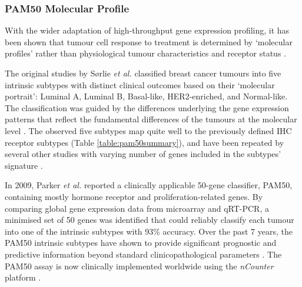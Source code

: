     
    
    
    
    
    
    
            
 
            
    \subsubsection{PAM50 Molecular Profile} \label{section:pam50}
    

With the wider adaptation of high-throughput gene expression profiling, it has been shown that tumour cell response to treatment is determined by ‘molecular profiles’ rather than physiological tumour characteristics and receptor status \cite{Weigelt2010}. 

The original studies by Sørlie \textit{et al.} \cite{Srlie2001GeneImplications} classified breast cancer tumours into five intrinsic subtypes with distinct clinical outcomes based on their ‘molecular portrait’: Luminal A, Luminal B, Basal-like, HER2-enriched, and Normal-like. The classification was guided by the differences underlying the gene expression patterns that reflect the fundamental differences of the tumours at the molecular level \cite{Srlie2003RepeatedSets}. The observed five subtypes map quite well to the previously defined IHC receptor subtypes (Table  \ref{table:pam50summary}), and have been repeated by several other studies with varying number of genes included in the subtypes’ signature \cite{Dai2015}. 

In 2009, Parker \textit{et al. }\cite{ParkerSupervisedSubtypes} reported a clinically applicable 50-gene classifier, PAM50, containing mostly hormone receptor and proliferation-related genes. By comparing global gene expression data from microarray and qRT-PCR, a minimised set of 50 genes was identified that could reliably classify each tumour into one of the intrinsic subtypes with 93\% accuracy. Over the past 7 years, the PAM50 intrinsic subtypes have shown to provide significant prognostic and predictive information beyond standard clinicopathological parameters \cite{GnantPredictingAlone, Vidal2017}. The PAM50 assay is now clinically implemented worldwide using the \textit{nCounter} platform \cite{Vidal2017}.

